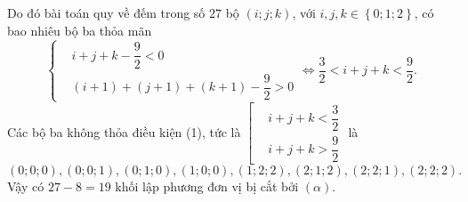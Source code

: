 \begin{ex}
{{
		}
		\noindent
		Do đó bài toán quy về đếm trong số $27$ bộ $\left({i;j;k}\right)$, với $i,j,k\in \left\{{0;1;2}\right\}$, có bao nhiêu bộ ba thỏa mãn
		\[\left\{\begin{aligned}& i+j+k-\dfrac{9}{2}<0 \\
		& (i+1)+(j+1)+(k+1)-\dfrac{9}{2}>0 
		\end{aligned}\right.\Leftrightarrow \dfrac{3}{2}<i+j+k<\dfrac{9}{2}.\tag{1}\]
		Các bộ ba không thỏa điều kiện (1), tức là $\left[\begin{aligned}& i+j+k<\dfrac{3}{2} \\
		& i+j+k>\dfrac{9}{2} 
		\end{aligned}\right.$ là
		$$\left({0;0;0}\right),\left({0;0;1}\right),\left({0;1;0}\right),\left({1;0;0}\right),\left({1;2;2}\right),\left({2;1;2}\right),\left({2;2;1}\right),\left({2;2;2}\right).$$
		Vậy có $27-8=19$ khối lập phương đơn vị bị cắt bởi $(\alpha)$.
	}
\end{ex}

